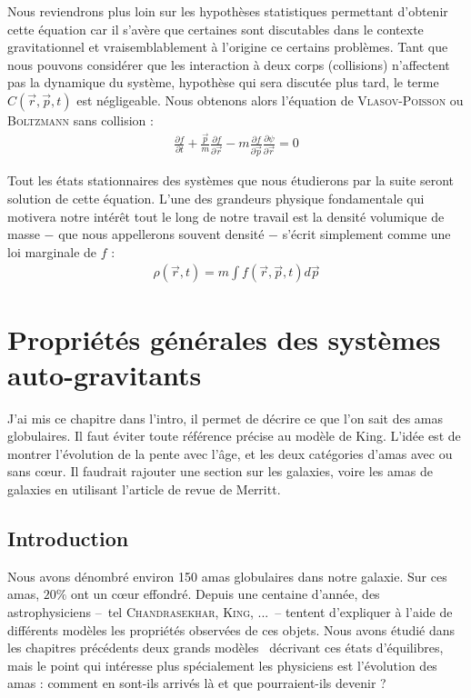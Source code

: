 	Nous reviendrons plus loin sur les hypoth\`{e}ses statistiques permettant d'obtenir cette \'{e}quation car il s'av\`{e}re que certaines sont discutables dans le contexte gravitationnel et vraisemblablement \`{a} l'origine ce certains probl\`{e}mes. Tant que nous pouvons consid\'{e}rer que les  interaction \`{a} deux corps (collisions) n'affectent pas la dynamique du syst\`{e}me, hypoth\`{e}se qui sera discut\'{e}e plus tard, le
	terme  $ C(\vec{r},\vec{p}, t) $ est n\'{e}gligeable. Nous obtenons alors l'\'{e}quation de
	\textsc{Vlasov-Poisson} ou \textsc{Boltzmann} sans collision :
	\begin{align}
		\frac{\partial f}{\partial t} +\frac{\vec{p}}{m}\frac{\partial f}{\partial \vec{r}} - m\frac{\partial f}{\partial \vec{p}} \frac{\partial \psi}{\partial \vec{r}} = 0
		\label{Vla-Pois}
	\end{align}

	Tout les \'{e}tats stationnaires des syst\`{e}mes que nous \'{e}tudierons par la suite seront solution de cette \'{e}quation.
	L'une des grandeurs physique fondamentale qui motivera notre int\'{e}r\^{e}t tout le long de notre travail est la densit\'{e} volumique de masse $-$ que nous appellerons souvent densit\'{e} $-$ s'\'{e}crit simplement comme une loi marginale de $f$ :
	\begin{align}
		\rho(\vec{r},t) = m\int f(\vec{r},\vec{p},t) d\vec{p} \label{def-dens}
	\end{align}

\chapter{Propriétés générales des systèmes auto-gravitants}

J'ai mis ce chapitre dans l'intro, il permet de décrire ce que l'on sait des amas globulaires. Il faut éviter toute référence précise au modèle de King. L'idée est de montrer l'évolution de la pente avec l'âge, et les deux catégories d'amas avec ou sans c\oe ur.
 Il faudrait rajouter une section sur les galaxies, voire les amas de galaxies en utilisant l'article de revue de Merritt.

	\minitoc
	\section{Introduction}

	Nous avons dénombré environ 150 amas globulaires dans notre galaxie. Sur ces amas, $20\%$ ont un cœur effondré. %
	Depuis une centaine d'année, des astrophysiciens --~tel \textsc{Chandrasekhar}, \textsc{King}, ...~--
	tentent d'expliquer à l'aide de différents modèles les propriétés observées de ces objets.
	Nous avons étudié dans les chapitres précédents deux \og grands modèles \fg~décrivant ces états d'équilibres,
	mais le point qui intéresse plus spécialement les physiciens est l'évolution des amas : comment en sont-ils
	arrivés là et que pourraient-ils devenir ?

